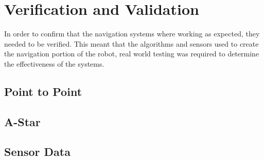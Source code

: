\section{Verification and Validation}
In order to confirm that the navigation systems where working as expected, they needed to be verified. This meant that the algorithms and sensors used to create the navigation portion of the robot, real world testing was required to determine the effectiveness of the systems.
\subsection{Point to Point}

\subsection{A-Star}

\subsection{Sensor Data}